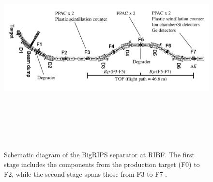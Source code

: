 \documentclass[a4paper,12pt,twoside]{report}
\begin{document}
\begin{figure}[h!]
\centering
\includegraphics[width=19cm, height=11cm, angle=90]{bigrips.png}
\caption[Schematic diagram of the BigRIPS separator]{Schematic diagram of the BigRIPS separator at RIBF. The first stage includes the components from the production target (F0) to F2, while the second stage spans those from F3 to F7 \cite{FUKUDA2013323}.}
\end{figure}
\end{document}
